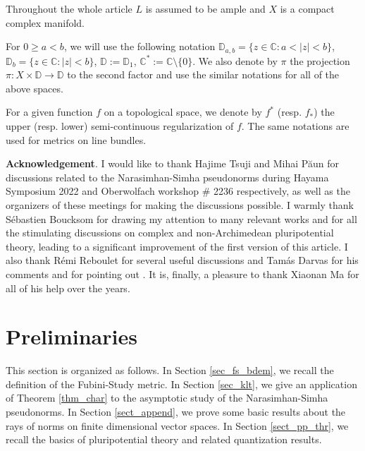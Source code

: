 \documentclass[12pt]{article}
\numberwithin{equation}{section}
\theoremstyle{theorem}
\theoremstyle{definition}
\theoremstyle{remark}
\newcommand{\comp}{\mathbb{C}}
\begin{document}
	\par 
	Throughout the whole article $L$ is assumed to be ample and $X$ is a compact complex manifold.	
	\par 
	For $0 \geq a < b$, we will use the following notation $\mathbb{D}_{a, b} = \{ z \in \comp : a < |z| < b \}$, $\mathbb{D}_b = \{ z \in \comp : |z| < b \}$, $\mathbb{D} := \mathbb{D}_1$, $\comp^* := \comp \setminus \{0\}$.
	We also denote by $\pi$ the projection $\pi : X \times \mathbb{D} \to \mathbb{D}$ to the second factor and use the similar notations for all of the above spaces.
	\par 
	For a given function $f$ on a topological space, we denote by $f^*$ (resp. $f_*$) the upper (resp. lower) semi-continuous regularization of $f$. The same notations are used for metrics on line bundles. 
	\par 
	\par 
	\textbf{Acknowledgement}. 
	I would like to thank Hajime Tsuji and Mihai Păun for discussions related to the Narasimhan-Simha pseudonorms during Hayama Symposium 2022 and Oberwolfach workshop \# 2236 respectively, as well as the organizers of these meetings for making the discussions possible.
	I warmly thank Sébastien Boucksom for drawing my attention to many relevant works and for all the stimulating discussions on complex and non-Archimedean pluripotential theory, leading to a significant improvement of the first version of this article.
	I also thank Rémi Reboulet for several useful discussions and Tamás Darvas for his comments and for pointing out \cite{DarvXiaTest}.
	It is, finally, a pleasure to thank Xiaonan Ma for all of his help over the years.
	
	\section{Preliminaries}\label{sect_prel}
	This section is organized as follows.
	In Section \ref{sec_fs_bdem}, we recall the definition of the Fubini-Study metric.
	In Section \ref{sec_klt}, we give an application of Theorem \ref{thm_char} to the asymptotic study of the Narasimhan-Simha pseudonorms.
	In Section \ref{sect_append}, we prove some basic results about the rays of norms on finite dimensional vector spaces.
	In Section \ref{sect_pp_thr}, we recall the basics of pluripotential theory and related quantization results.
	
\end{document}
